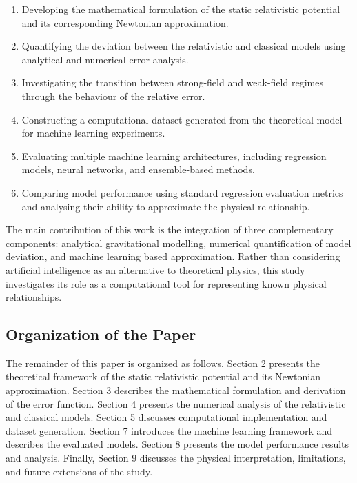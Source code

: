 \documentclass[
]{article}
\begin{document}
\begin{enumerate}
\def\labelenumi{\arabic{enumi}.}
\item
  Developing the mathematical formulation of the static relativistic
  potential and its corresponding Newtonian approximation.
\item
  Quantifying the deviation between the relativistic and classical
  models using analytical and numerical error analysis.
\item
  Investigating the transition between strong-field and weak-field
  regimes through the behaviour of the relative error.
\item
  Constructing a computational dataset generated from the theoretical
  model for machine learning experiments.
\item
  Evaluating multiple machine learning architectures, including
  regression models, neural networks, and ensemble-based methods.
\item
  Comparing model performance using standard regression evaluation
  metrics and analysing their ability to approximate the physical
  relationship.
\end{enumerate}

The main contribution of this work is the integration of three
complementary components: analytical gravitational modelling, numerical
quantification of model deviation, and machine learning based
approximation. Rather than considering artificial intelligence as an
alternative to theoretical physics, this study investigates its role as
a computational tool for representing known physical relationships.

\subsection{Organization of the Paper}\label{organization-of-the-paper}

The remainder of this paper is organized as follows. Section 2 presents
the theoretical framework of the static relativistic potential and its
Newtonian approximation. Section 3 describes the mathematical
formulation and derivation of the error function. Section 4 presents the
numerical analysis of the relativistic and classical models. Section 5
discusses computational implementation and dataset generation. Section 7
introduces the machine learning framework and describes the evaluated
models. Section 8 presents the model performance results and analysis.
Finally, Section 9 discusses the physical interpretation, limitations,
and future extensions of the study.
\end{document}
